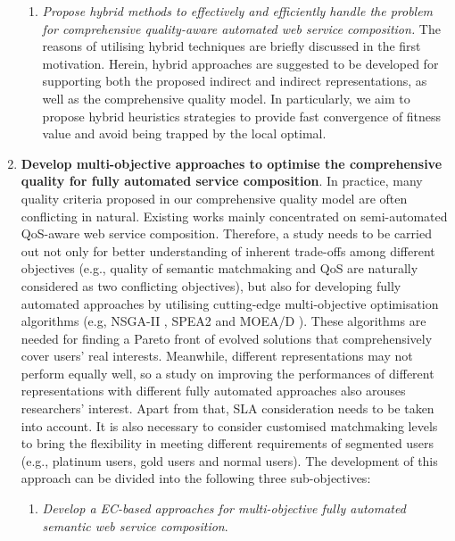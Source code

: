 \begin{enumerate}
\begin{enumerate}
    \item \emph{Propose hybrid methods to effectively and efficiently handle the problem for comprehensive quality-aware automated web service composition.} The reasons of utilising hybrid techniques are briefly discussed in the first motivation. Herein, hybrid approaches are suggested to be developed for supporting both the proposed indirect and indirect representations, as well as the comprehensive quality model. In particularly, we aim to propose hybrid heuristics strategies to provide fast convergence of fitness value and avoid being trapped by the local optimal.
  \end{enumerate}
 
 \item \label{Obj:2} \textbf{Develop multi-objective approaches to optimise the comprehensive quality for fully automated service composition}. In practice, many quality criteria proposed in our comprehensive quality model are often conflicting in natural. Existing works \cite{chen2014partial,xiang2014qos,yin2014hybrid,liu2005dynamic,yu2013efficient,zhang2010qos} mainly concentrated on semi-automated QoS-aware web service composition. Therefore, a study needs to be carried out not only for better understanding of inherent trade-offs among different objectives (e.g., quality of semantic matchmaking and QoS are naturally considered as two conflicting objectives), but also for developing fully automated approaches by utilising cutting-edge multi-objective optimisation algorithms (e.g, NSGA-II \cite{deb2002fast}, SPEA2 \cite{zitzler2001spea2} and MOEA/D \cite{zhang2007moea}). These algorithms are needed for finding a Pareto front of evolved solutions that comprehensively cover users' real interests. Meanwhile, different representations may not perform equally well, so a study on improving the performances of different representations with different fully automated approaches also arouses researchers' interest. Apart from that, SLA consideration needs to be taken into account. It is also necessary to consider customised matchmaking levels to bring the flexibility in meeting different requirements of segmented users (e.g., platinum users, gold users and normal users). The development of this approach can be divided into the following three sub-objectives:
   \begin{enumerate}
   
    \item \label{Obj:2.1} \emph{Develop a EC-based approaches for multi-objective fully automated semantic web service composition}. 
    

\end{enumerate}
\end{enumerate}
